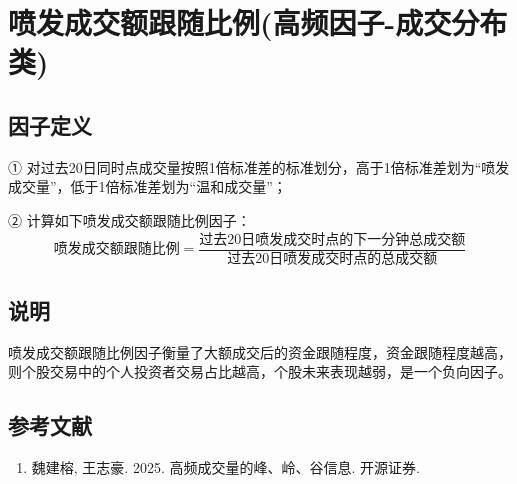 \documentclass{article}
\begin{document}
\section{喷发成交额跟随比例(高频因子-成交分布类)}

\subsection{因子定义}

① 对过去20日同时点成交量按照1倍标准差的标准划分，高于1倍标准差划为“喷发成交量”，低于1倍标准差划为“温和成交量”；

② 计算如下喷发成交额跟随比例因子：
\begin{equation}
    \text{喷发成交额跟随比例} = \frac{\text{过去20日喷发成交时点的下一分钟总成交额}}{\text{过去20日喷发成交时点的总成交额}}
\end{equation}

\subsection{说明}
喷发成交额跟随比例因子衡量了大额成交后的资金跟随程度，资金跟随程度越高，则个股交易中的个人投资者交易占比越高，个股未来表现越弱，是一个负向因子。

\subsection{参考文献}
\begin{enumerate}
    \item 魏建榕, 王志豪. 2025. 高频成交量的峰、岭、谷信息. 开源证券.
\end{enumerate}
\end{document}

